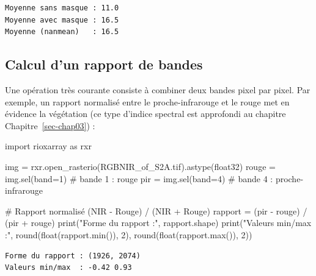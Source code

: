\documentclass[
  french,
  11pt,
  letterpaper,
  open=any,
  twoside=false,
  french]{scrbook}
\newenvironment{Shaded}{\begin{snugshade}}{\end{snugshade}}
\newcommand{\BuiltInTok}[1]{\textcolor[rgb]{0.00,0.23,0.31}{#1}}
\newcommand{\CommentTok}[1]{\textcolor[rgb]{0.37,0.37,0.37}{#1}}
\newcommand{\DecValTok}[1]{\textcolor[rgb]{0.68,0.00,0.00}{#1}}
\newcommand{\ImportTok}[1]{\textcolor[rgb]{0.00,0.46,0.62}{#1}}
\newcommand{\NormalTok}[1]{\textcolor[rgb]{0.00,0.23,0.31}{#1}}
\newcommand{\OperatorTok}[1]{\textcolor[rgb]{0.37,0.37,0.37}{#1}}
\newcommand{\StringTok}[1]{\textcolor[rgb]{0.13,0.47,0.30}{#1}}
\begin{document}
\begin{verbatim}
Moyenne sans masque : 11.0
Moyenne avec masque : 16.5
Moyenne (nanmean)   : 16.5
\end{verbatim}

\subsection{Calcul d'un rapport de
bandes}\label{calcul-dun-rapport-de-bandes}

Une opération très courante consiste à combiner deux bandes pixel par
pixel. Par exemple, un rapport normalisé entre le proche-infrarouge et
le rouge met en évidence la végétation (ce type d'indice spectral est
approfondi au chapitre Chapitre~\ref{sec-chap03}) :

\begin{Shaded}
\begin{Highlighting}[]
\ImportTok{import}\NormalTok{ rioxarray }\ImportTok{as}\NormalTok{ rxr}

\NormalTok{img }\OperatorTok{=}\NormalTok{ rxr.open\_rasterio(}\StringTok{\textquotesingle{}RGBNIR\_of\_S2A.tif\textquotesingle{}}\NormalTok{).astype(}\StringTok{\textquotesingle{}float32\textquotesingle{}}\NormalTok{)}
\NormalTok{rouge }\OperatorTok{=}\NormalTok{ img.sel(band}\OperatorTok{=}\DecValTok{1}\NormalTok{)     }\CommentTok{\# bande 1 : rouge}
\NormalTok{pir   }\OperatorTok{=}\NormalTok{ img.sel(band}\OperatorTok{=}\DecValTok{4}\NormalTok{)     }\CommentTok{\# bande 4 : proche{-}infrarouge}

\CommentTok{\# Rapport normalisé (NIR {-} Rouge) / (NIR + Rouge)}
\NormalTok{rapport }\OperatorTok{=}\NormalTok{ (pir }\OperatorTok{{-}}\NormalTok{ rouge) }\OperatorTok{/}\NormalTok{ (pir }\OperatorTok{+}\NormalTok{ rouge)}
\BuiltInTok{print}\NormalTok{(}\StringTok{"Forme du rapport :"}\NormalTok{, rapport.shape)}
\BuiltInTok{print}\NormalTok{(}\StringTok{"Valeurs min/max  :"}\NormalTok{, }\BuiltInTok{round}\NormalTok{(}\BuiltInTok{float}\NormalTok{(rapport.}\BuiltInTok{min}\NormalTok{()), }\DecValTok{2}\NormalTok{), }\BuiltInTok{round}\NormalTok{(}\BuiltInTok{float}\NormalTok{(rapport.}\BuiltInTok{max}\NormalTok{()), }\DecValTok{2}\NormalTok{))}
\end{Highlighting}
\end{Shaded}

\begin{verbatim}
Forme du rapport : (1926, 2074)
Valeurs min/max  : -0.42 0.93
\end{verbatim}
\end{document}

